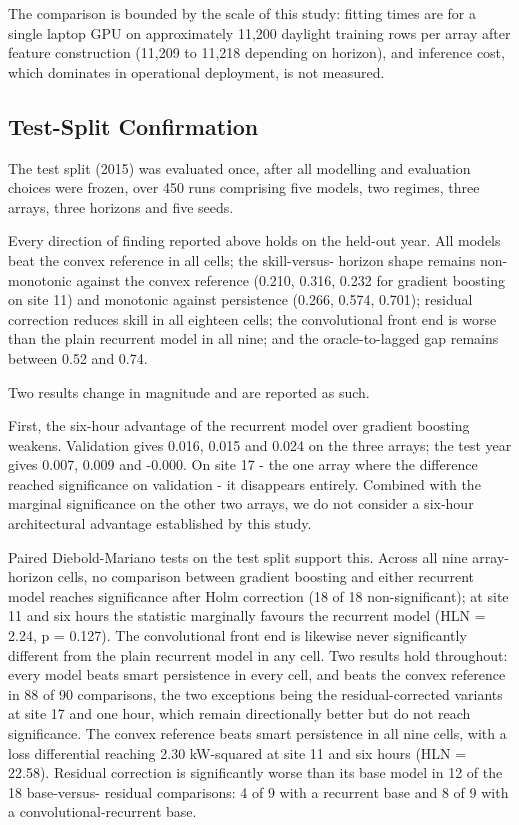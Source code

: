 The comparison is bounded by the scale of this study: fitting times are
for a single laptop GPU on approximately 11,200 daylight training rows
per array after feature construction (11,209 to 11,218 depending on
horizon), and
inference cost, which dominates in operational deployment, is not
measured.

\subsection{Test-Split Confirmation}

The test split (2015) was evaluated once, after all modelling and
evaluation choices were frozen, over 450 runs comprising five models,
two regimes, three arrays, three horizons and five seeds.

Every direction of finding reported above holds on the held-out year.
All models beat the convex reference in all cells; the skill-versus-
horizon shape remains non-monotonic against the convex reference (0.210,
0.316, 0.232 for gradient boosting on site 11) and monotonic against
persistence (0.266, 0.574, 0.701); residual correction reduces skill in
all eighteen cells; the convolutional front end is worse than the plain
recurrent model in all nine; and the oracle-to-lagged gap remains
between 0.52 and 0.74.

Two results change in magnitude and are reported as such.

First, the six-hour advantage of the recurrent model over gradient
boosting weakens. Validation gives 0.016, 0.015 and 0.024 on the three
arrays; the test year gives 0.007, 0.009 and -0.000. On site 17 - the
one array where the difference reached significance on validation - it
disappears entirely. Combined with the marginal significance on the
other two arrays, we do not consider a six-hour architectural advantage
established by this study.

Paired Diebold-Mariano tests on the test split support this. Across all
nine array-horizon cells, no comparison between gradient boosting and
either recurrent model reaches significance after Holm correction (18 of
18 non-significant); at site 11 and six hours the statistic marginally
favours the recurrent model (HLN = 2.24, p = 0.127). The convolutional
front end is likewise never significantly different from the plain
recurrent model in any cell. Two results hold throughout: every model
beats smart persistence in every cell, and beats the convex reference in
88 of 90 comparisons, the two exceptions being the residual-corrected
variants at site 17 and one hour, which remain directionally better but
do not reach significance. The convex reference beats smart persistence
in all nine cells, with a loss differential reaching 2.30 kW-squared at
site 11 and six hours (HLN = 22.58). Residual correction is
significantly worse than its base model in 12 of the 18 base-versus-
residual comparisons: 4 of 9 with a recurrent base and 8 of 9 with a
convolutional-recurrent base.

